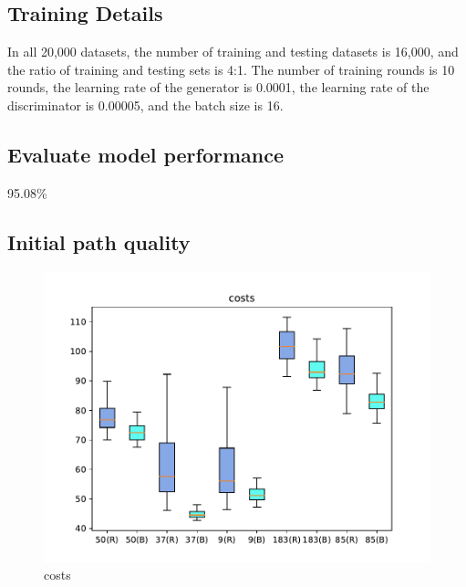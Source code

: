 \documentclass[smallcondensed]{svjour3}     %
\begin{document}
\subsection{Training Details}
In all 20,000 datasets, the number of training and testing datasets is 16,000, and the ratio of training and testing sets is 4:1. 
The number of training rounds is 10 rounds, the learning rate of the generator is 0.0001, the learning rate of the discriminator is 0.00005, and the batch size is 16.

\subsection{Evaluate model performance}
95.08\%

\subsection{Initial path quality}

\begin{figure}
\centering
\includegraphics[scale=0.45]{costs.pdf}%
\caption{costs}     
\label{fig:costs}
\end{figure}
\end{document}
